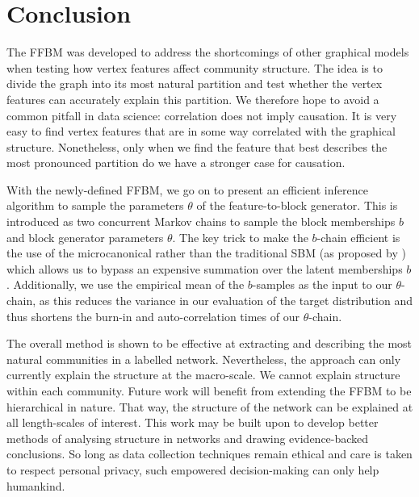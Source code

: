 \section{Conclusion}
\label{sec:conclusion}

The FFBM was developed to address the shortcomings of other graphical models when testing how vertex features affect community structure. The idea is to divide the graph into its most natural partition and test whether the vertex features can accurately explain this partition. We therefore hope to avoid a common pitfall in data science: correlation does not imply causation. It is very easy to find vertex features that are in some way correlated with the graphical structure. Nonetheless, only when we find the feature that best describes the most pronounced partition do we have a stronger case for causation.

With the newly-defined FFBM, we go on to present an efficient inference algorithm to sample the parameters $\theta$ of the feature-to-block generator. This is introduced as two concurrent Markov chains to sample the block memberships $b$ and block generator parameters $\theta$. The key trick to make the $b$-chain efficient is the use of the microcanonical rather than the traditional SBM (as proposed by \citet{Peixoto-Bayesian-Microcanonical}) which allows us to bypass an expensive summation over the latent memberships $b$. Additionally, we use the empirical mean of the $b$-samples as the input to our $\theta$-chain, as this reduces the variance in our evaluation of the target distribution and thus shortens the burn-in and auto-correlation times of our $\theta$-chain.

The overall method is shown to be effective at extracting and describing the most natural communities in a labelled network. Nevertheless, the approach can only currently explain the structure at the macro-scale. We cannot explain structure within each community. Future work will benefit from extending the FFBM to be hierarchical in nature. That way, the structure of the network can be explained at all length-scales of interest. This work may be built upon to develop better methods of analysing structure in networks and drawing evidence-backed conclusions. So long as data collection techniques remain ethical and care is taken to respect personal privacy, such empowered decision-making can only help humankind.